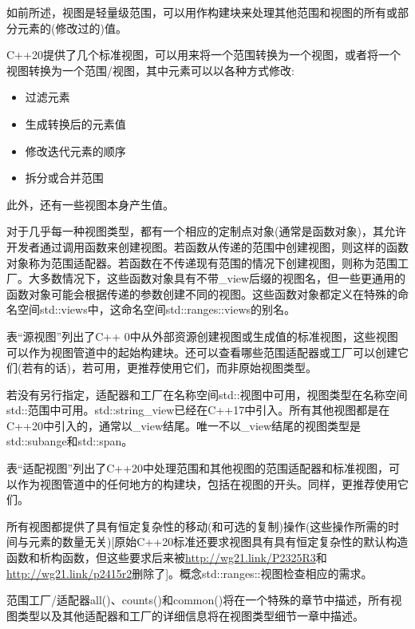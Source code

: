 
如前所述，视图是轻量级范围，可以用作构建块来处理其他范围和视图的所有或部分元素的(修改过的)值。

C++20提供了几个标准视图，可以用来将一个范围转换为一个视图，或者将一个视图转换为一个范围/视图，其中元素可以以各种方式修改:

\begin{itemize}
\item
过滤元素

\item
生成转换后的元素值

\item
修改迭代元素的顺序

\item
拆分或合并范围
\end{itemize}

此外，还有一些视图本身产生值。

对于几乎每一种视图类型，都有一个相应的定制点对象(通常是函数对象)，其允许开发者通过调用函数来创建视图。若函数从传递的范围中创建视图，则这样的函数对象称为范围适配器。若函数在不传递现有范围的情况下创建视图，则称为范围工厂。大多数情况下，这些函数对象具有不带\_view后缀的视图名，但一些更通用的函数对象可能会根据传递的参数创建不同的视图。这些函数对象都定义在特殊的命名空间std::views中，这命名空间std::ranges::views的别名。

表“源视图”列出了C++ 0中从外部资源创建视图或生成值的标准视图，这些视图可以作为视图管道中的起始构建块。还可以查看哪些范围适配器或工厂可以创建它们(若有的话)，若可用，更推荐使用它们，而非原始视图类型。

若没有另行指定，适配器和工厂在名称空间std::视图中可用，视图类型在名称空间std::范围中可用。std::string\_view已经在C++17中引入。所有其他视图都是在C++20中引入的，通常以\_view结尾。唯一不以\_view结尾的视图类型是std::subange和std::span。

表“适配视图”列出了C++20中处理范围和其他视图的范围适配器和标准视图，可以作为视图管道中的任何地方的构建块，包括在视图的开头。同样，更推荐使用它们。

所有视图都提供了具有恒定复杂性的移动(和可选的复制)操作(这些操作所需的时间与元素的数量无关)[原始C++20标准还要求视图具有具有恒定复杂性的默认构造函数和析构函数，但这些要求后来被\url{http://wg21.link/P2325R3}和\url{http://wg21.link/p2415r2}删除了]。概念std::ranges::视图检查相应的需求。

范围工厂/适配器all()、counts()和common()将在一个特殊的章节中描述，所有视图类型以及其他适配器和工厂的详细信息将在视图类型细节一章中描述。

